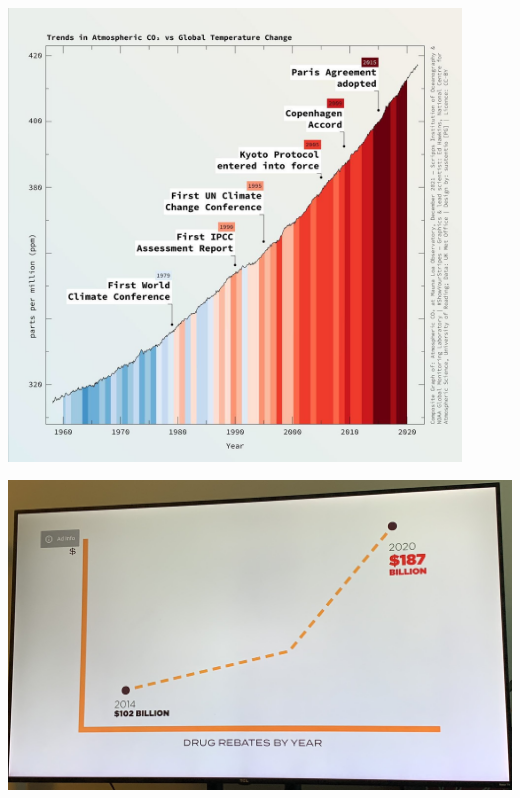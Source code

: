 \documentclass{beamer}
\begin{document}
 \begin{frame}\centering\includegraphics[width=0.9\textwidth,keepaspectratio]{graphcrimes/FYi_zJZVEAAxFW9.jpeg}\end{frame}
 \begin{frame}\centering\includegraphics[width=\textwidth,keepaspectratio]{graphcrimes/FZwXuJjX0AEhyz-.jpeg}\end{frame}
\end{document}
